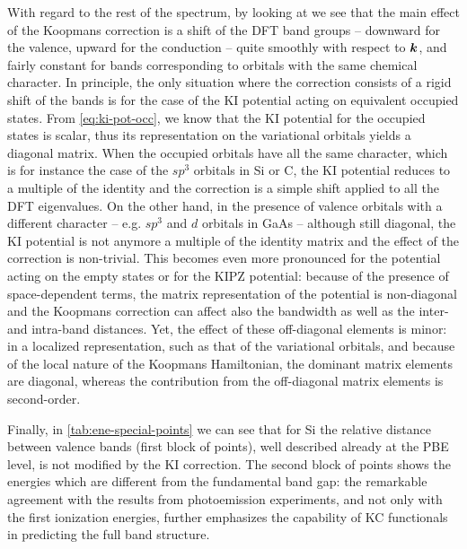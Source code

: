 With regard to the rest of the spectrum, by looking at  we see that the main effect of the Koopmans correction is a shift of the DFT band groups -- downward for the valence, upward for the conduction -- quite smoothly with respect to ${\bm k}$, and fairly constant for bands corresponding to orbitals with the same chemical character. In principle, the only situation where the correction consists of a rigid shift of the bands is for the case of the KI potential acting on equivalent occupied states. From \cref{eq:ki-pot-occ}, we know that the KI potential for the occupied states is scalar, thus its representation on the variational orbitals yields a diagonal matrix. When the occupied orbitals have all the same character, which is for instance the case of the $sp^3$ orbitals in Si or C, the KI potential reduces to a multiple of the identity and the correction is a simple shift applied to all the DFT eigenvalues. On the other hand, in the presence of valence orbitals with a different character -- e.g. $sp^3$ and $d$ orbitals in GaAs -- although still diagonal, the KI potential is not anymore a multiple of the identity matrix and the effect of the correction is non-trivial. This becomes even more pronounced for the potential acting on the empty states or for the KIPZ potential: because of the presence of space-dependent terms, the matrix representation of the potential is non-diagonal and the Koopmans correction can affect also the bandwidth as well as the inter- and intra-band distances. Yet, the effect of these off-diagonal elements is minor: in a localized representation, such as that of the variational orbitals, and because of the local nature of the Koopmans Hamiltonian, the dominant matrix elements are diagonal, whereas the contribution from the off-diagonal matrix elements is second-order.

Finally, in \cref{tab:ene-special-points} we can see that for Si the relative distance between valence bands (first block of points), well described already at the PBE level, is not modified by the KI correction. The second block of points shows the energies which are different from the fundamental band gap: the remarkable agreement with the results from photoemission experiments, and not only with the first ionization energies, further emphasizes the capability of KC functionals in predicting the full band structure.

